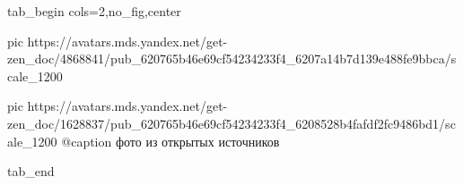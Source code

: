  
 
 
 
 


\ifcmt
  tab_begin cols=2,no_fig,center

     pic https://avatars.mds.yandex.net/get-zen_doc/4868841/pub_620765b46e69cf54234233f4_6207a14b7d139e488fe9bbca/scale_1200

		 pic https://avatars.mds.yandex.net/get-zen_doc/1628837/pub_620765b46e69cf54234233f4_6208528b4fafdf2fc9486bd1/scale_1200
		 @caption фото из открытых источников

  tab_end
\fi
